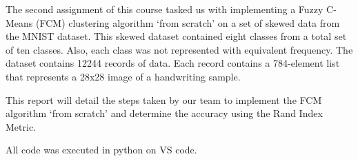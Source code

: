 The second assignment of this course tasked us with implementing a Fuzzy C-Means (FCM) clustering algorithm `from scratch' on a set of skewed data from the MNIST dataset. This skewed dataset contained eight classes from a total set of ten classes. Also, each class was not represented with equivalent frequency. The dataset contains 12244 records of data. Each record contains a 784-element list that represents a 28x28 image of a handwriting sample.

This report will detail the steps taken by our team to implement the FCM algorithm `from scratch' and determine the accuracy using the Rand Index Metric.

All code was executed in python on VS code.
